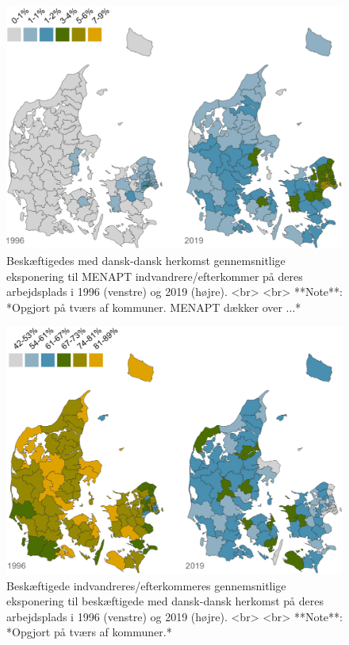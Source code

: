 \documentclass[
]{book}
\begin{document}
\begin{figure}
\includegraphics[width=1\linewidth]{images/Figur_4_3} \caption{Beskæftigedes med dansk-dansk herkomst gennemsnitlige eksponering til MENAPT indvandrere/efterkommer på deres arbejdsplads i 1996 (venstre) og 2019 (højre). <br> <br> **Note**: *Opgjort på tværs af kommuner. MENAPT dækker over ...*}\label{fig:fig-4-3}
\end{figure}

\begin{figure}
\includegraphics[width=1\linewidth]{images/Figur_4_4} \caption{Beskæftigede indvandreres/efterkommeres gennemsnitlige eksponering til beskæftigede med dansk-dansk herkomst på deres arbejdsplads i 1996 (venstre) og 2019 (højre). <br> <br> **Note**: *Opgjort på tværs af kommuner.*}\label{fig:fig-4-4}
\end{figure}
\end{document}
